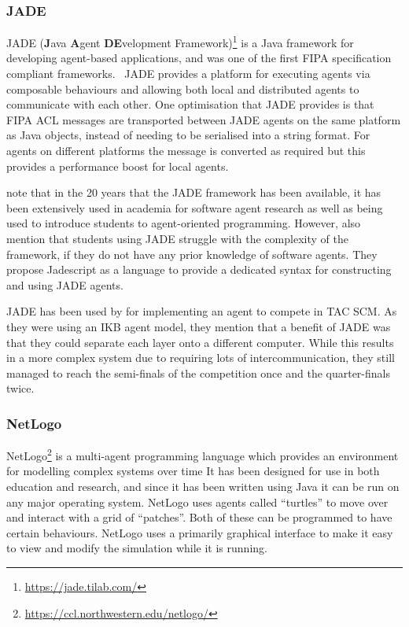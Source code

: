 \subsubsection{JADE}

JADE (\textbf{J}ava \textbf{A}gent \textbf{DE}velopment Framework)\footnote{\url{https://jade.tilab.com/}} is a Java framework for developing agent-based applications, and was one of the first FIPA specification compliant frameworks.~\cite{bellifemine1999jade}
JADE provides a platform for executing agents via composable behaviours and allowing both local and distributed agents to communicate with each other.
One optimisation that JADE provides is that FIPA ACL messages are transported between JADE agents on the same platform as Java objects, instead of needing to be serialised into a string format.
For agents on different platforms the message is converted as required but this provides a performance boost for local agents.

 note that in the 20 years that the JADE framework has been available, it has been extensively used in academia for software agent research as well as being used to introduce students to agent-oriented programming.
However,  also mention that students using JADE struggle with the complexity of the framework, if they do not have any prior knowledge of software agents.
They propose Jadescript as a language to provide a dedicated syntax for constructing and using JADE agents.

JADE has been used by  for implementing an agent to compete in TAC SCM\@.
As they were using an IKB agent model, they mention that a benefit of JADE was that they could separate each layer onto a different computer.
While this results in a more complex system due to requiring lots of intercommunication, they still managed to reach the semi-finals of the competition once and the quarter-finals twice.~\cite{collins2009flexible}

\subsubsection{NetLogo}

NetLogo\footnote{\url{https://ccl.northwestern.edu/netlogo/}} is a multi-agent programming language which provides an environment for modelling complex systems over time
It has been designed for use in both education and research, and since it has been written using Java it can be run on any major operating system.
NetLogo uses agents called ``turtles'' to move over and interact with a grid of ``patches''.
Both of these can be programmed to have certain behaviours.
NetLogo uses a primarily graphical interface to make it easy to view and modify the simulation while it is running.~\cite{tisue2004netlogo}

